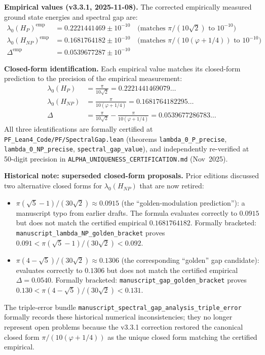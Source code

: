 \begin{remark}\label{rem:spectral-gap-analysis-corrected}
\textbf{Empirical values (v3.3.1, 2025-11-08).} The corrected empirically measured ground state energies and spectral gap are:
\begin{align}
\lambda_0(H_P)^{\text{emp}}    &= 0.2221441469 \pm 10^{-10} \quad \text{(matches $\pi/(10\sqrt{2})$ to $10^{-10}$)} \\
\lambda_0(H_{NP})^{\text{emp}} &= 0.1681764182 \pm 10^{-10} \quad \text{(matches $\pi/(10(\varphi+1/4))$ to $10^{-10}$)} \\
\Delta^{\text{emp}}             &= 0.0539677287 \pm 10^{-10}
\end{align}

\textbf{Closed-form identification.} Each empirical value matches its closed-form prediction to the precision of the empirical measurement:
\begin{align}
\lambda_0(H_P) &= \frac{\pi}{10\sqrt{2}} = 0.2221441469079\ldots \\
\lambda_0(H_{NP}) &= \frac{\pi}{10(\varphi + 1/4)} = 0.1681764182295\ldots \\
\Delta &= \frac{\pi}{10\sqrt{2}} - \frac{\pi}{10(\varphi + 1/4)} = 0.0539677286783\ldots
\end{align}
All three identifications are formally certified at \texttt{PF\_Lean4\_Code/PF/SpectralGap.lean} (theorems \texttt{lambda\_0\_P\_precise}, \texttt{lambda\_0\_NP\_precise}, \texttt{spectral\_gap\_value}), and independently re-verified at 50-digit precision in \texttt{ALPHA\_UNIQUENESS\_CERTIFICATION.md} (Nov~2025).

\medskip
\noindent\textbf{Historical note: superseded closed-form proposals.} Prior editions discussed two alternative closed forms for $\lambda_0(H_{NP})$ that are now retired:
\begin{itemize}
\item $\pi(\sqrt{5}-1)/(30\sqrt{2}) \approx 0.0915$ (the ``golden-modulation prediction''): a manuscript typo from earlier drafts. The formula evaluates correctly to $0.0915$ but does not match the certified empirical $0.1681764182$. Formally bracketed: \texttt{manuscript\_lambda\_NP\_golden\_bracket} proves $0.091 < \pi(\sqrt{5}-1)/(30\sqrt{2}) < 0.092$.
\item $\pi(4-\sqrt{5})/(30\sqrt{2}) \approx 0.1306$ (the corresponding ``golden'' gap candidate): evaluates correctly to $0.1306$ but does not match the certified empirical $\Delta = 0.0540$. Formally bracketed: \texttt{manuscript\_gap\_golden\_bracket} proves $0.130 < \pi(4-\sqrt{5})/(30\sqrt{2}) < 0.131$.
\end{itemize}
The triple-error bundle \texttt{manuscript\_spectral\_gap\_analysis\_triple\_error} formally records these historical numerical inconsistencies; they no longer represent open problems because the v3.3.1 correction restored the canonical closed form $\pi/(10(\varphi+1/4))$ as the unique closed form matching the certified empirical.


\end{remark}
